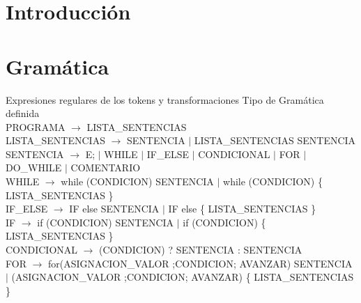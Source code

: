 \documentclass[10pt,a4paper]{article}
\begin{document}

\fecha{\today}



\maketitle

\tableofcontents

\newpage
\section{Introducción}

\section{Gramática}
Expresiones regulares de los tokens y transformaciones
Tipo de Gramática definida \\

PROGRAMA $\rightarrow$ LISTA\_SENTENCIAS \\

LISTA\_SENTENCIAS $\rightarrow$ SENTENCIA $|$ LISTA\_SENTENCIAS SENTENCIA \\

SENTENCIA $\rightarrow$ E; $|$ WHILE $|$ IF\_ELSE $|$ CONDICIONAL $|$ FOR $|$ DO\_WHILE $|$ COMENTARIO \\

WHILE $\rightarrow$ while (CONDICION) SENTENCIA $|$ while (CONDICION) \{ LISTA\_SENTENCIAS \} \\

IF\_ELSE $\rightarrow$ IF else SENTENCIA $|$ IF else \{ LISTA\_SENTENCIAS \} \\

IF $\rightarrow$ if (CONDICION) SENTENCIA $|$ if (CONDICION) \{ LISTA\_SENTENCIAS \} \\

CONDICIONAL $\rightarrow$ (CONDICION) ? SENTENCIA : SENTENCIA \\

FOR $\rightarrow$ for(ASIGNACION\_VALOR ;CONDICION; AVANZAR) SENTENCIA $|$ (ASIGNACION\_VALOR ;CONDICION; AVANZAR) \{ LISTA\_SENTENCIAS \} \\
\end{document}
